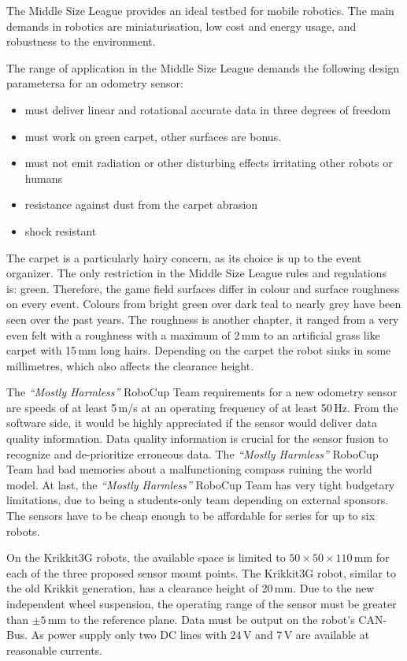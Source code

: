 \documentclass[12pt,a4paper]{article}
\newcommand{\MH}{\emph{``Mostly Harmless''} RoboCup Team\xspace}
\newcommand{\MSL}{Middle Size League\xspace}
\begin{document}
The \MSL provides an ideal testbed for mobile robotics.
The main demands in robotics are miniaturisation, low cost and energy usage, and robustness to the environment.

The range of application in the \MSL demands the following design parametersa for an odometry sensor:
\begin{itemize}
  \item must deliver linear and rotational accurate data in three degrees of freedom
  \item must work on green carpet, other surfaces are bonus.
  \item must not emit radiation or other disturbing effects irritating other robots or humans
  \item resistance against dust from the carpet abrasion
  \item shock resistant
\end{itemize}

The carpet is a particularly hairy concern, as its choice is up to the event organizer.
The only restriction in the \MSL rules and regulations~\cite{msl-rules} is: green.
Therefore, the game field surfaces differ in colour and surface roughness on every event.
Colours from bright green over dark teal to nearly grey have been seen over the past years.
The roughness is another chapter, it ranged from a very even felt with a roughness with a maximum of 2\,mm to an artificial grass like carpet with 15\,mm long hairs. 
Depending on the carpet the robot sinks in some millimetres, which also affects the clearance height.

The \MH requirements for a new odometry sensor are speeds of at least 5\,m/s at an operating frequency of at least 50\,Hz.
From the software side, it would be highly appreciated if the sensor would deliver data quality information.
Data quality information is crucial for the sensor fusion to recognize and de-prioritize erroneous data.
The \MH had bad memories about a malfunctioning compass ruining the world model.
At last, the \MH has very tight budgetary limitations, due to being a students-only team depending on external sponsors.
The sensors have to be cheap enough to be affordable for series for up to six robots.


On the Krikkit3G robots, the available space is limited to $50\times50\times110$\,mm for each of the three proposed sensor mount points.
The Krikkit3G robot, similar to the old Krikkit generation, has a clearance height of 20\,mm.
Due to the new independent wheel suspension, the operating range of the sensor must be greater than $\pm 5$\,mm to the reference plane.
Data must be output on the robot's CAN-Bus.
As power supply only two DC lines with 24\,V and 7\,V are available at reasonable currents.
\end{document}
